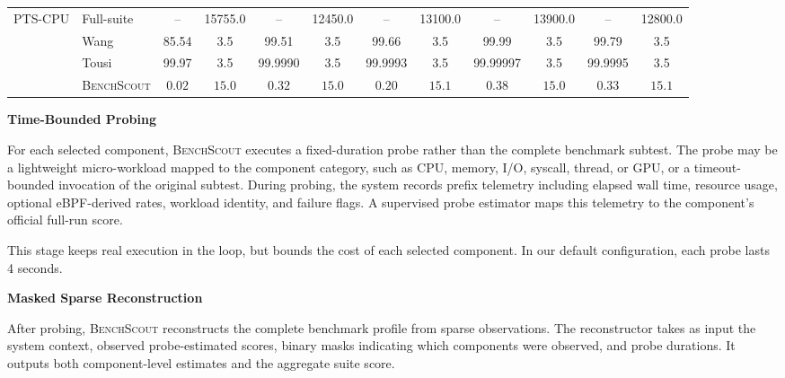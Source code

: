 \documentclass[sigplan,10pt, anonymous]{acmart}
\newcommand{\ourmethod}{\textsc{BenchScout}\xspace}
\newcommand{\ptscpu}{PTS-CPU}
\newcommand{\ptsgpu}{PTS-GPU}
\begin{document}
\begin{table}[t]
\begin{tabular}{llcccccccccc}
\midrule

\multirow{4}{*}{\ptscpu} 
& Full-suite & -- & 15755.0 & -- & 12450.0 & -- & 13100.0 & -- & 13900.0 & -- & 12800.0 \\
& Wang~\cite{wang2019predicting} & 85.54 & 3.5 & 99.51 & 3.5 & 99.66 & 3.5 & 99.99 & 3.5 & 99.79 & 3.5 \\
& Tousi~\cite{tousi2022comparative} & 99.97 & 3.5 & 99.9990 & 3.5 & 99.9993 & 3.5 & 99.99997 & 3.5 & 99.9995 & 3.5 \\
& \ourmethod & $\mathbf{0.02}$ & $\mathbf{15.0}$ & $\mathbf{0.32}$ & $\mathbf{15.0}$ & $\mathbf{0.20}$ & $\mathbf{15.1}$ & $\mathbf{0.38}$ & $\mathbf{15.0}$ & $\mathbf{0.33}$ & $\mathbf{15.1}$ \\



\bottomrule
\end{tabular}
\end{table}
\textbf{Time-Bounded Probing}

For each selected component, \textsc{BenchScout} executes a fixed-duration probe rather than the complete benchmark subtest. The probe may be a lightweight micro-workload mapped to the component category, such as CPU, memory, I/O, syscall, thread, or GPU, or a timeout-bounded invocation of the original subtest. During probing, the system records prefix telemetry including elapsed wall time, resource usage, optional eBPF-derived rates, workload identity, and failure flags. A supervised probe estimator maps this telemetry to the component's official full-run score.

This stage keeps real execution in the loop, but bounds the cost of each selected component. In our default configuration, each probe lasts 4 seconds.

\textbf{Masked Sparse Reconstruction}

After probing, \textsc{BenchScout} reconstructs the complete benchmark profile from sparse observations. The reconstructor takes as input the system context, observed probe-estimated scores, binary masks indicating which components were observed, and probe durations. It outputs both component-level estimates and the aggregate suite score.
\end{document}
